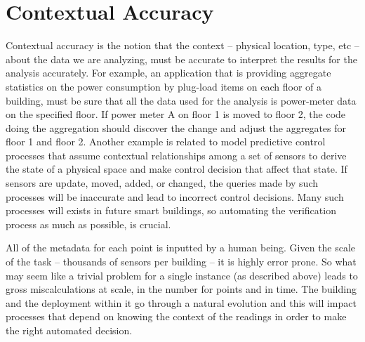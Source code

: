 

\section{Contextual Accuracy}

Contextual accuracy is the notion that the context -- physical location, type, etc -- about the data we are analyzing, must be accurate
to interpret the results for the analysis accurately.  For example, an application that is providing aggregate statistics on the 
power consumption by plug-load items on each floor of a building, must be sure that all the data used for the analysis 
is power-meter data on the specified floor.  If power meter A on floor 1 is moved to floor 2, the code doing the aggregation
should discover the change and adjust the aggregates for floor 1 and floor 2.  Another example is related to model predictive 
control processes that assume contextual relationships among a set of sensors to derive the state of a physical space and 
make control decision that affect that state.  If sensors are update, moved, added, or changed, the queries made by such processes
will be inaccurate and lead to incorrect control decisions.  Many such processes will exists in future smart buildings, so
automating the verification process as much as possible, is crucial.

All of the metadata for each point is inputted by a human being.  Given the scale of the task -- thousands of sensors per building --
it is highly error prone.  So what may seem like a trivial problem for a single instance (as described above) leads to gross
miscalculations at scale, in the number for points and in time.  The building and the deployment within it go through a natural
evolution and this will impact processes that depend on knowing the context of the readings in order to make the right automated decision.

